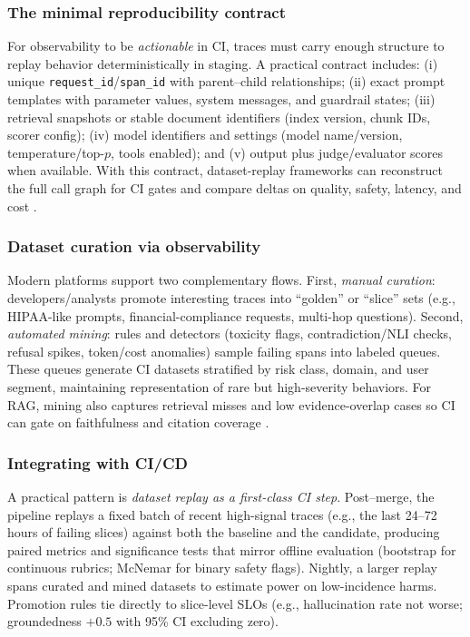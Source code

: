 \subsubsection{The minimal reproducibility contract}
For observability to be \emph{actionable} in CI, traces must carry enough structure to replay behavior deterministically in staging. A practical contract includes: (i) unique \texttt{request\_id}/\texttt{span\_id} with parent--child relationships; (ii) exact prompt templates with parameter values, system messages, and guardrail states; (iii) retrieval snapshots or stable document identifiers (index version, chunk IDs, scorer config); (iv) model identifiers and settings (model name/version, temperature/top-$p$, tools enabled); and (v) output plus judge/evaluator scores when available. With this contract, dataset-replay frameworks can reconstruct the full call graph for CI gates and compare deltas on quality, safety, latency, and cost \cite{mlflow_llm_eval}.

\subsubsection{Dataset curation via observability}
Modern platforms support two complementary flows. First, \emph{manual curation}: developers/analysts promote interesting traces into ``golden'' or ``slice'' sets (e.g., HIPAA-like prompts, financial-compliance requests, multi-hop questions). Second, \emph{automated mining}: rules and detectors (toxicity flags, contradiction/NLI checks, refusal spikes, token/cost anomalies) sample failing spans into labeled queues. These queues generate CI datasets stratified by risk class, domain, and user segment, maintaining representation of rare but high-severity behaviors. For RAG, mining also captures retrieval misses and low evidence-overlap cases so CI can gate on faithfulness and citation coverage \cite{ragas_eacl2024,phoenix_rag}.

\subsubsection{Integrating with CI/CD}
A practical pattern is \emph{dataset replay as a first-class CI step}. Post--merge, the pipeline replays a fixed batch of recent high-signal traces (e.g., the last 24--72 hours of failing slices) against both the baseline and the candidate, producing paired metrics and significance tests that mirror offline evaluation (bootstrap for continuous rubrics; McNemar for binary safety flags). Nightly, a larger replay spans curated and mined datasets to estimate power on low-incidence harms. Promotion rules tie directly to slice-level SLOs (e.g., hallucination rate not worse; groundedness $+0.5$ with 95\% CI excluding zero).

